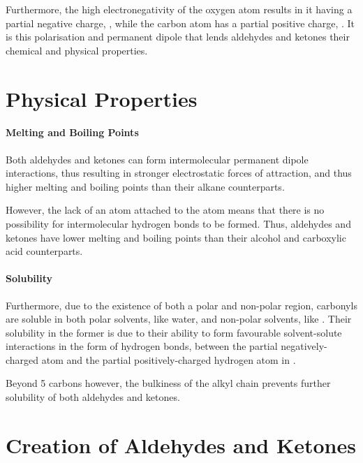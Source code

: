 			Furthermore, the high electronegativity of the oxygen atom results in it having a partial negative charge, \deltam{}, while the
			carbon atom has a partial positive charge, \deltap{}. It is this polarisation and permanent dipole that lends aldehydes and ketones
			their chemical and physical properties.



	\section{Physical Properties}

		\paragraph{Melting and Boiling Points}

		Both aldehydes and ketones can form intermolecular permanent dipole interactions, thus resulting in stronger electrostatic forces
		of attraction, and thus higher melting and boiling points than their alkane counterparts.

		However, the lack of an  atom attached to the  atom means that there is no possibility for intermolecular hydrogen
		bonds to be formed. Thus, aldehydes and ketones have lower melting and boiling points than their alcohol and carboxylic acid
		counterparts.


		\paragraph{Solubility}

		Furthermore, due to the existence of both a polar and non-polar region, carbonyls are soluble in both polar solvents, like water,
		and non-polar solvents, like . Their solubility in the former is due to their ability to form favourable
		solvent-solute interactions in the form of hydrogen bonds, between the partial negatively-charged  atom and the partial
		positively-charged hydrogen atom in .

		Beyond 5 carbons however, the bulkiness of the alkyl chain prevents further solubility of both aldehydes and ketones.


	\pagebreak
	\section{Creation of Aldehydes and Ketones}

